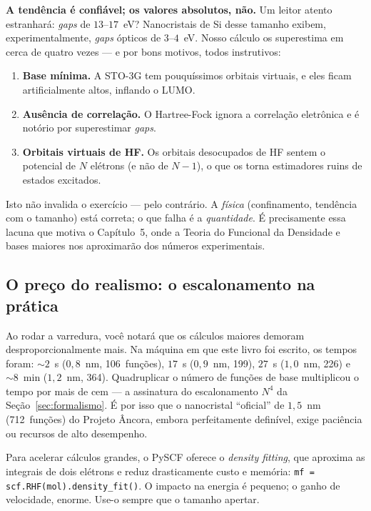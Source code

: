 \documentclass[11pt,a4paper,openany]{book}
\newcommand{\code}[1]{\texttt{#1}}
\newcommand{\pyscf}{\textsf{PySCF}}
\begin{document}
\begin{caixaatencao}
\textbf{A tendência é confiável; os valores absolutos, não.} Um leitor atento
estranhará: \emph{gaps} de $13$--$17$~eV? Nanocristais de Si desse tamanho exibem,
experimentalmente, \emph{gaps} ópticos de $3$--$4$~eV. Nosso cálculo os
superestima em cerca de quatro vezes --- e por bons motivos, todos instrutivos:
\begin{enumerate}[leftmargin=*,nosep]
  \item \textbf{Base mínima.} A STO-3G tem pouquíssimos orbitais virtuais, e eles
        ficam artificialmente altos, inflando o LUMO.
  \item \textbf{Ausência de correlação.} O Hartree-Fock ignora a correlação
        eletrônica e é notório por superestimar \emph{gaps}.
  \item \textbf{Orbitais virtuais de HF.} Os orbitais desocupados de HF sentem o
        potencial de $N$ elétrons (e não de $N-1$), o que os torna estimadores
        ruins de estados excitados.
\end{enumerate}
Isto não invalida o exercício --- pelo contrário. A \emph{física} (confinamento,
tendência com o tamanho) está correta; o que falha é a \emph{quantidade}. É
precisamente essa lacuna que motiva o Capítulo~5, onde a Teoria do Funcional da
Densidade e bases maiores nos aproximarão dos números experimentais.
\end{caixaatencao}

\subsection{O preço do realismo: o escalonamento na prática}

Ao rodar a varredura, você notará que os cálculos maiores demoram
desproporcionalmente mais. Na máquina em que este livro foi escrito, os tempos
foram: $\sim\!2$~s ($0{,}8$~nm, 106~funções), $17$~s ($0{,}9$~nm, 199), $27$~s
($1{,}0$~nm, 226) e $\sim\!8$~min ($1{,}2$~nm, 364). Quadruplicar o número de
funções de base multiplicou o tempo por mais de cem --- a assinatura do
escalonamento $N^4$ da Seção~\ref{sec:formalismo}. É por isso que o nanocristal
``oficial'' de $1{,}5$~nm (712~funções) do Projeto Âncora, embora perfeitamente
definível, exige paciência ou recursos de alto desempenho.

\begin{caixadica}
Para acelerar cálculos grandes, o \pyscf{} oferece o \emph{density fitting}, que
aproxima as integrais de dois elétrons e reduz drasticamente custo e memória:
\code{mf = scf.RHF(mol).density\_fit()}. O impacto na energia é pequeno; o ganho de
velocidade, enorme. Use-o sempre que o tamanho apertar.
\end{caixadica}
\end{document}
